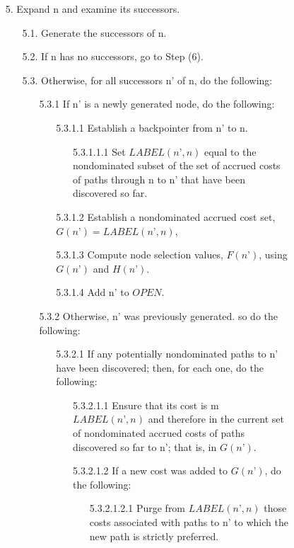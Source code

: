 \begin{figure}
\begin{itemize}\setlength{\itemsep}{-2mm}
  \item[5. ] Expand n and examine its successors.
  \begin{itemize}\setlength{\itemsep}{-2mm}
  	\item[5.1. ] Generate the successors of n.
  	\item[5.2. ] If n has no successors, go to Step (6).
  	\item[5.3. ] Otherwise, for all successors n’ of n, do the following:
  	\begin{itemize}
  		\item[5.3.1 ] If n’ is a newly generated node, do the following:
  		\begin{enumerate}
  			\item[5.3.1.1 ] Establish a backpointer from n’ to n.
  			\begin{enumerate}
	  			\item[5.3.1.1.1 ] Set $LABEL(n’, n)$ equal to the nondominated subset of the set of accrued costs of paths through n to n’ that have been discovered so far.
  			\end{enumerate}
  			\item[5.3.1.2 ] Establish a nondominated accrued cost set, $G(n’) = LABEL(n’, n)$,
  			\item[5.3.1.3 ] Compute node selection values, $F(n’)$, using $G(n’)$ and $H(n’)$.
  			\item[5.3.1.4 ] Add n’ to $OPEN$.
  		\end{enumerate}
		\item[5.3.2 ] Otherwise, n’ was previously generated. so do the following:
		\begin{enumerate}
			\item[5.3.2.1 ] If any potentially nondominated paths to n’ have been discovered; then, for each one, do the following:
			\begin{enumerate}
				\item[5.3.2.1.1 ] Ensure that its cost is m $LABEL(n’, n)$ and therefore in the current set of nondominated accrued costs of paths discovered so far to n’; that is, in $G(n’)$.
				\item[5.3.2.1.2 ] If a new cost was added to $G(n’)$, do the following:
				\begin{enumerate}
					\item[5.3.2.1.2.1 ]	Purge from $LABEL(n’, n)$ those costs associated with paths to n’ to which the new path is strictly preferred.

\end{enumerate}
\end{enumerate}
\end{enumerate}
\end{itemize}
\end{itemize}
\end{itemize}
\end{figure}
